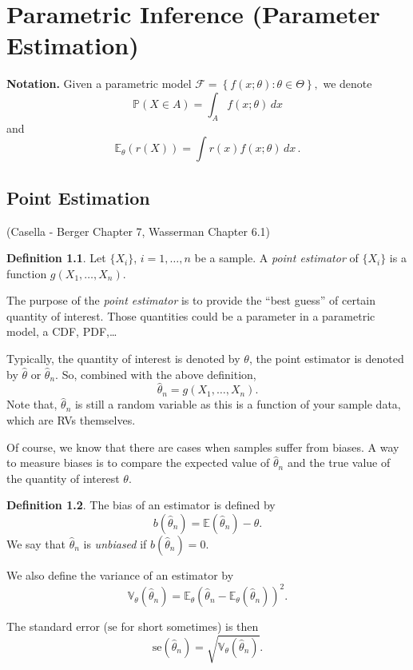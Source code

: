 \documentclass[
  openany]{book}
\theoremstyle{definition}
\newtheorem{definition}{Definition}[chapter]
\theoremstyle{definition}
\theoremstyle{definition}
\theoremstyle{definition}
\theoremstyle{remark}
\begin{document}
\chapter{Parametric Inference (Parameter Estimation)}\label{parametric-inference-parameter-estimation}

\textbf{Notation.}
Given a parametric model
\(\mathcal{F} = \left\{ f(x;\theta) : \theta \in \Theta  \right\} ,\)
we denote
\[ \mathbb{P}(X \in A ) = \int_A f(x;\theta) \, dx\]
and
\[ \mathbb{E}_\theta ( r(X)) = \int r(x) f(x;\theta) \, dx \,.\]

\section{Point Estimation}\label{point-estimation}

(Casella - Berger Chapter 7, Wasserman Chapter 6.1)

\begin{definition}
Let \(\{X_i\}\), \(i = 1, \dots, n\) be a sample.
A \emph{point estimator} of \(\{X_i\}\) is a function
\(g(X_1, \dots, X_n)\).
\end{definition}

The purpose of the \emph{point estimator} is to provide the ``best guess'' of certain quantity of interest.
Those quantities could be a parameter in a parametric model, a CDF, PDF,\ldots{}

Typically, the quantity of interest is denoted by \(\theta\), the point
estimator is denoted by \(\hat \theta\) or \(\hat \theta_n\).
So, combined with the above definition,
\[ \hat \theta_n = g(X_1, \dots, X_n).\]
Note that, \(\hat \theta_n\) is still a random variable as this is a function of
your sample data, which are RVs themselves.

Of course, we know that there are cases when samples suffer from biases.
A way to measure biases is to compare the expected value of \(\hat \theta_n\) and
the true value of the quantity of interest \(\theta\).

\begin{definition}
The bias of an estimator is defined by
\[ b(\hat \theta_n) = \mathbb{E}(\hat \theta_n) - \theta. \]
We say that \(\hat \theta_n\) is \emph{unbiased} if \(b(\hat \theta_n) = 0\).

We also define the variance of an estimator by
\[ \mathbb{V}_\theta(\hat \theta_n) = \mathbb{E}_\theta (\hat \theta_n - \mathbb{E}_\theta (\hat \theta_n))^2 .\]

The standard error (\(\mathrm{se}\) for short sometimes) is then
\[ \mathrm{se}(\hat \theta_n) = \sqrt{\mathbb{V}_\theta (\hat \theta_n)}. \]
\end{definition}
\end{document}
